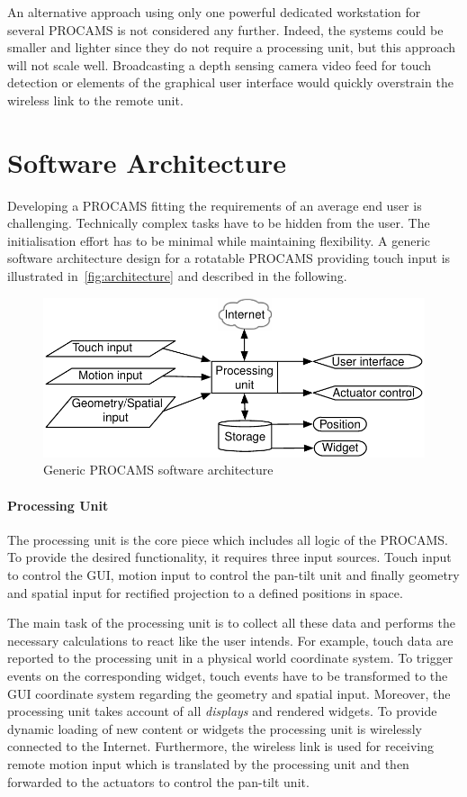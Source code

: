 An alternative approach using only one powerful dedicated workstation for several PROCAMS is not considered any further. Indeed, the systems could be smaller and lighter since they do not require a processing unit, but this approach will not scale well.
Broadcasting a depth sensing camera video feed for touch detection or elements of the graphical user interface would quickly overstrain the wireless link to the remote unit.

\section{Software Architecture}
Developing a \ac{PROCAMS} fitting the requirements of an average end user is challenging. Technically complex tasks have to be hidden from the user. The initialisation effort has to be minimal while maintaining flexibility. A generic software architecture design for a rotatable \ac{PROCAMS} providing touch input is illustrated in~\autoref{fig:architecture} and described in the following. 

\begin{figure}[htbp] 
   \centering
   \includegraphics[width=\textwidth]{images/architecture/architecture_noshaddow.pdf} 
   \caption{Generic \acl{PROCAMS} software architecture}
   \label{fig:architecture}
\end{figure}

\paragraph{Processing Unit}
The processing unit is the core piece which includes all logic of the \ac{PROCAMS}.
To provide the desired functionality, it requires three input sources. Touch input to control the \ac{GUI}, motion input to control the pan-tilt unit and finally geometry and spatial input for rectified projection to a defined positions in space.

The main task of the processing unit is to collect all these data and performs the necessary calculations to react like the user intends. For example, touch data are reported to the processing unit in a physical world coordinate system. To trigger events on the corresponding widget, touch events have to be transformed to the \ac{GUI} coordinate system regarding the geometry and spatial input. Moreover, the processing unit takes account of all \emph{displays} and rendered widgets. 
To provide dynamic loading of new content or widgets the  processing unit is wirelessly connected to the Internet.
Furthermore, the wireless link is used for receiving remote motion input which is translated by the processing unit and then forwarded to the actuators to control the pan-tilt unit.

